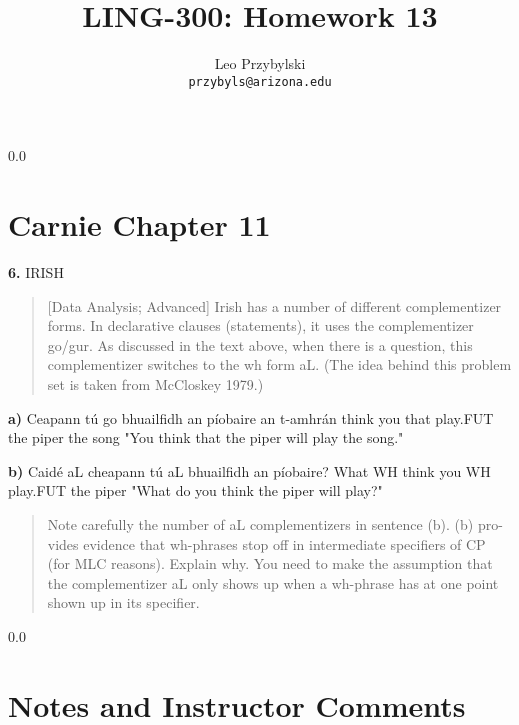 \documentclass[11pt,notitlepage]{article}
\title{LING-300: Homework 13}
\author{Leo Przybylski\\
\texttt{przybyls@arizona.edu}}
\newcommand{\question}[2]{\textbf{#1.} #2}
\newcommand{\subquestion}[2]{\par\hspace{0.5cm} \textbf{#1)} #2}
\begin{document}
  \maketitle
  {\setlength{\baselineskip}%
           {0.0\baselineskip}
  \section*{Carnie Chapter 11}
  \hrulefill \par}
\question{6}{IRISH}
\begin{quote}
[Data Analysis; Advanced]
Irish has a number of different complementizer forms. In declarative
clauses (statements), it uses the complementizer go/gur. As discussed
in the text above, when there is a question, this complementizer
switches to the wh form aL. (The idea behind this problem set is taken
from McCloskey 1979.)
\end{quote}

\subquestion{a}{Ceapann tú go bhuailfidh an píobaire an t-amhrán think you that play.FUT the piper the song "You think that the piper will play the song."}
\subquestion{b}{Caidé aL cheapann tú aL bhuailfidh an píobaire? What
  WH think you WH play.FUT the piper "What do you think the piper will
  play?"}
\begin{quote}
Note carefully the number of aL complementizers in sentence (b). (b)
pro- vides evidence that wh-phrases stop off in intermediate
specifiers of CP (for MLC reasons). Explain why. You need to make the
assumption that the complementizer aL only shows up when a wh-phrase
has at one point shown up in its specifier.
\end{quote}

\newpage
  {\setlength{\baselineskip}%
           {0.0\baselineskip}
  \section*{Notes and Instructor Comments}
  \hrulefill \par}
\end{document}
